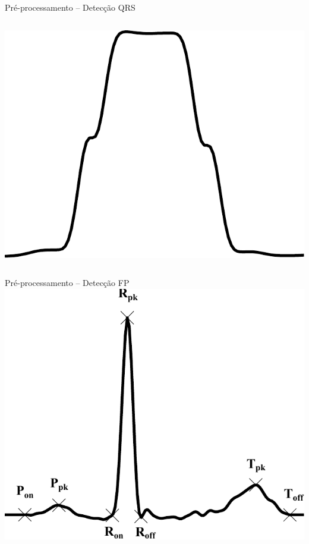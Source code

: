 \begin{frame}{Pré-processamento -- Detecção QRS}
\begin{columns}[b]
        \includegraphics[scale=0.15]{figures/moving-average.pdf}
    \end{columns}
\end{frame}

\begin{frame}{Pré-processamento -- Detecção FP}
    \center
    \includegraphics[scale=0.7]{figures/fiducial-points.pdf}
\end{frame}


